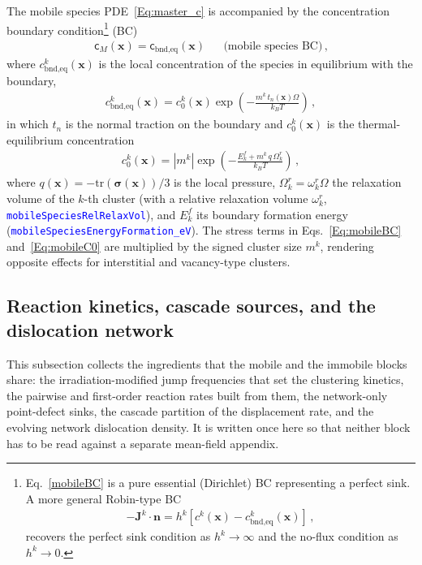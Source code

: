 \documentclass{article}
\newcommand{\textttclr}[1]{\textcolor{blue}{\texttt{#1}}}
\newcommand{\spvec}[1]{\bm{\mathsf{#1}}}   %
\begin{document}
The mobile species PDE~\eqref{Eq:master_c} is accompanied by the concentration boundary condition\footnote{
Eq.~\eqref{mobileBC} is a pure essential (Dirichlet) BC representing a perfect sink. A more general Robin-type BC
\begin{align}
-\bm J^k\cdot \bm n = h^k\left[c^k(\bm x)-c^k_\text{bnd,eq}(\bm x)\right]\, ,
\end{align}
recovers the perfect sink condition as $h^k\rightarrow\infty$ and the no-flux condition as $h^k\rightarrow0$.
}
(BC)
\begin{align}
\spvec{c}_M(\bm x)=\spvec{c}_\text{bnd,eq}(\bm x) && \text{(mobile species BC)}\, ,
\label{mobileBC}
\end{align}
where $c^k_\text{bnd,eq}(\bm x)$ is the local concentration of the species in equilibrium with the boundary,
\begin{align}
c^k_\text{bnd,eq}(\bm x)=c^k_0(\bm x)\exp\left(-\frac{m^k\,t_n(\bm x)\Omega}{k_BT}\right) \, ,
\label{Eq:mobileBC}
\end{align}
in which $t_n$ is the normal traction on the boundary and $c^k_0(\bm x)$ is the thermal-equilibrium concentration
\begin{align}
c^k_0(\bm x)= |m^k|\exp\left(-\frac{E^f_k+m^k\,q\,\Omega_k^r}{k_BT}\right)\, ,
\label{Eq:mobileC0}
\end{align}
where $q(\bm x)=-\text{tr}(\bm\sigma(\bm x))/3$ is the local pressure, $\Omega_k^r=\omega_k^r\Omega$ the relaxation volume of the $k$-th cluster (with a relative relaxation volume $\omega_k^r$, \textttclr{mobileSpeciesRelRelaxVol}), and $E_k^f$ its boundary formation energy (\textttclr{mobileSpeciesEnergyFormation\_eV}). The stress terms in Eqs.~\eqref{Eq:mobileBC} and~\eqref{Eq:mobileC0} are multiplied by the signed cluster size $m^k$, rendering opposite effects for interstitial and vacancy-type clusters.


\subsection{Reaction kinetics, cascade sources, and the dislocation network}
\label{sec:kinetics}

This subsection collects the ingredients that the mobile and the immobile blocks
share: the irradiation-modified jump frequencies that set the clustering
kinetics, the pairwise and first-order reaction rates built from them, the
network-only point-defect sinks, the cascade partition of the displacement rate,
and the evolving network dislocation density. It is written once here so that
neither block has to be read against a separate mean-field appendix.
\end{document}
